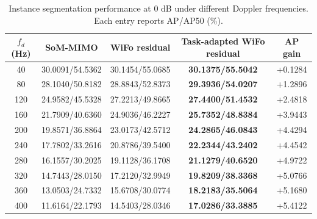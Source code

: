 \begin{table}[t]
\centering
\caption{Instance segmentation performance at 0 dB under different Doppler frequencies. Each entry reports AP/AP50 (\%).}
\label{tab:doppler_main}
\begin{tabular}{c|ccc|c}
\hline
$f_d$ (Hz) & SoM-MIMO & WiFo residual & Task-adapted WiFo residual & AP gain \\
\hline
40 & 30.0091/54.5362 & 30.1454/55.0685 & \textbf{30.1375/55.5042} & +0.1284 \\
80 & 28.1040/50.8182 & 28.8843/52.8373 & \textbf{29.3936/54.0207} & +1.2896 \\
120 & 24.9582/45.5328 & 27.2213/49.8665 & \textbf{27.4400/51.4532} & +2.4818 \\
160 & 21.7909/40.6360 & 24.9036/46.2227 & \textbf{25.7352/48.8384} & +3.9443 \\
200 & 19.8571/36.8864 & 23.0173/42.5712 & \textbf{24.2865/46.0843} & +4.4294 \\
240 & 17.7802/33.2616 & 20.8786/39.5400 & \textbf{22.2344/43.2402} & +4.4542 \\
280 & 16.1557/30.2025 & 19.1128/36.1708 & \textbf{21.1279/40.6520} & +4.9722 \\
320 & 14.7443/28.0150 & 17.2120/32.9949 & \textbf{19.8209/38.3368} & +5.0766 \\
360 & 13.0503/24.7332 & 15.6708/30.0774 & \textbf{18.2183/35.5064} & +5.1680 \\
400 & 11.6164/22.1793 & 14.5403/28.0346 & \textbf{17.0286/33.3885} & +5.4122 \\
\hline
\end{tabular}
\end{table}
